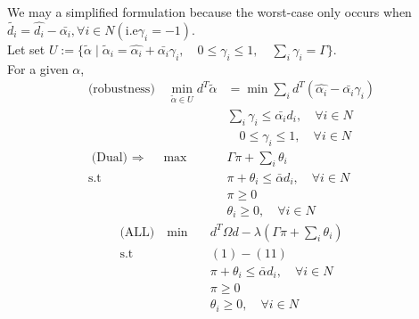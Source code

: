 \documentclass[11pt]{article}
\begin{document}
	We may a simplified formulation because the worst-case only occurs when $\tilde{d_i} =\hat{d_i} - \bar{\alpha_i}, \forall i \in N (\text{i.e} \gamma_i = -1)$. \\[5mm]
    Let set $U := \{ \tilde \alpha  \mid \tilde \alpha_i = \hat{\alpha_i} + \bar{\alpha_i}\gamma_i , \quad 0 \leq \gamma_i\leq 1 , \quad \sum_{i} \gamma_i = \Gamma \}$.\\[5mm]
	For a given $\alpha$,
	\begin{align*}
	\text{(robustness)} 
	\text{} \quad \min_{\tilde \alpha \in U } d^T \tilde{\alpha} &= \min \sum_{i} d^T (\hat{\alpha_i} - \bar{\alpha_i}\gamma_i ) \\
	& \sum_{i} \gamma_i \leq \bar{\alpha_i} d_i , \quad \forall i \in N\\
	& \quad 0 \leq \gamma_i\leq 1 , \quad \forall i \in N\\
	\text{(Dual) $\Rightarrow$} \quad \max\quad & \Gamma  \pi + \sum_{i} \theta_i  \\
	\text{s.t} \quad & \pi + \theta_i \leq   \bar{\alpha} d_i, \quad \forall i \in N \\
	& \pi \geq 0 \quad \\
	&  \theta_i \geq 0, \quad \forall i \in N 
	\end{align*}
	\begin{align*}
	\text{(ALL)} \quad \min \quad & d^T\Omega d  -  \lambda (\Gamma \pi + \sum_{i} \theta_i  ) \\
	\text{s.t } \quad & (1) - (11)\\
	&\pi + \theta_i \leq   \bar{\alpha} d_i, \quad \forall i \in N \\
	&\pi \geq 0 \\
	& \theta_i \geq 0, \quad \forall i \in N 
	\end{align*}
\end{document}

